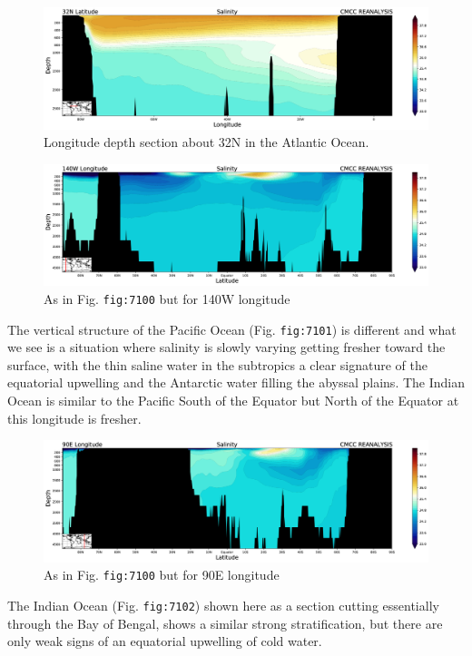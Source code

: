 \begin{figure}
\centering
\includegraphics[width = .7 \textwidth]{figs/GD/SectSalinity32N3000.png}
\caption{Longitude depth section about 32N in the Atlantic Ocean.}
\end{figure}

\begin{figure}
\centering
\includegraphics[width = .7 \textwidth]{figs/GD/SectSal140W5000.png}
\caption{As in Fig. \texttt{fig:7100} but for 140W longitude}
\end{figure}

The vertical structure of the Pacific Ocean (Fig. \texttt{fig:7101}) is
different and what we see is a situation where salinity is slowly
varying getting fresher toward the surface, with the thin saline water
in the subtropics a clear signature of the equatorial upwelling and the
Antarctic water filling the abyssal plains. The Indian Ocean is similar
to the Pacific South of the Equator but North of the Equator at this
longitude is fresher.

\begin{figure}
\centering
\includegraphics[width = .7 \textwidth]{figs/GD/SectSal90E5000.png}
\caption{As in Fig. \texttt{fig:7100} but for 90E longitude}
\end{figure}

The Indian Ocean (Fig. \texttt{fig:7102}) shown here as a section
cutting essentially through the Bay of Bengal, shows a similar strong
stratification, but there are only weak signs of an equatorial upwelling
of cold water.

